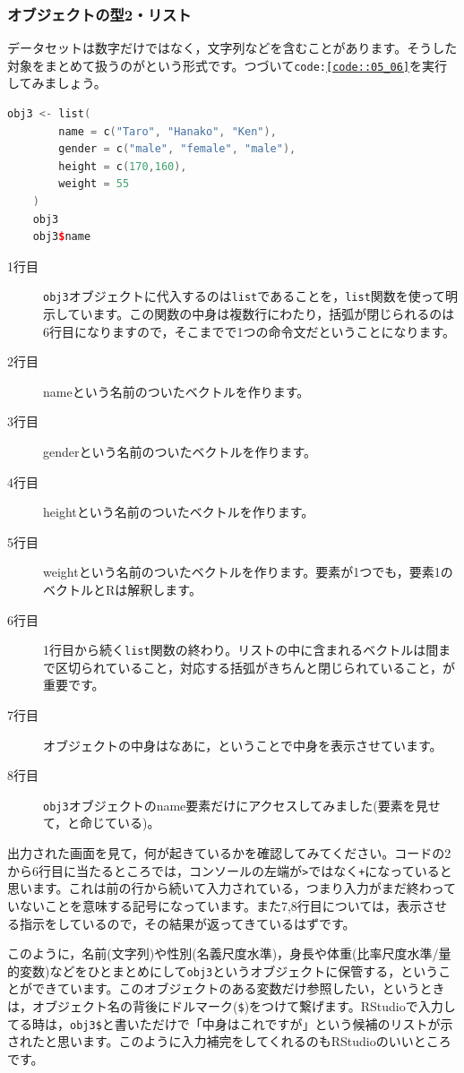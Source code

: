 \documentclass{ltjbook}
\begin{document}
\subsubsection{オブジェクトの型2・リスト}
データセットは数字だけではなく，文字列などを含むことがあります。そうした対象をまとめて扱うのがという形式です。つづいて\texttt{code:\ref{code::05_06}}を実行してみましょう。
\begin{lstlisting}[language=c++,label={code::05_06},caption={リスト型}]
	obj3 <- list(
		name = c("Taro", "Hanako", "Ken"),
		gender = c("male", "female", "male"),
		height = c(170,160),
		weight = 55
	)
	obj3
	obj3$name
\end{lstlisting}
\begin{description}
    \item[1行目] \texttt{obj3}オブジェクトに代入するのは\texttt{list}であることを，\texttt{list}関数を使って明示しています。この関数の中身は複数行にわたり，括弧が閉じられるのは6行目になりますので，そこまでで1つの命令文だということになります。
	\item[2行目] nameという名前のついたベクトルを作ります。
	\item[3行目] genderという名前のついたベクトルを作ります。
	\item[4行目] heightという名前のついたベクトルを作ります。
	\item[5行目] weightという名前のついたベクトルを作ります。要素が1つでも，要素1のベクトルとRは解釈します。
	\item[6行目] 1行目から続く\texttt{list}関数の終わり。リストの中に含まれるベクトルは間まで区切られていること，対応する括弧がきちんと閉じられていること，が重要です。
	\item[7行目] オブジェクトの中身はなあに，ということで中身を表示させています。
	\item[8行目] \texttt{obj3}オブジェクトのname要素だけにアクセスしてみました(要素を見せて，と命じている)。
\end{description}

出力された画面を見て，何が起きているかを確認してみてください。コードの2から6行目に当たるところでは，コンソールの左端が\verb|>|ではなく\verb|+|になっていると思います。これは前の行から続いて入力されている，つまり入力がまだ終わっていないことを意味する記号になっています。また7,8行目については，表示させる指示をしているので，その結果が返ってきているはずです。

このように，名前(文字列)や性別(名義尺度水準)，身長や体重(比率尺度水準/量的変数)などをひとまとめにして\texttt{obj3}というオブジェクトに保管する，ということができています。このオブジェクトのある変数だけ参照したい，というときは，オブジェクト名の背後にドルマーク(\verb|$|)をつけて繋げます。RStudioで入力してる時は，\verb|obj3$|と書いただけで「中身はこれですが」という候補のリストが示されたと思います。このように入力補完をしてくれるのもRStudioのいいところです。
\end{document}
